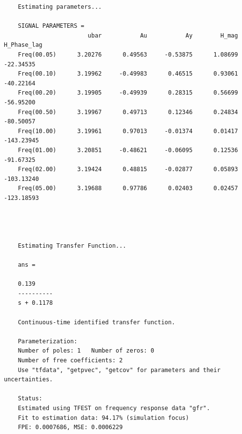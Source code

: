 \documentclass{article}
\begin{document}
\begin{verbatim}
	Estimating parameters...
	
	SIGNAL PARAMETERS = 
	                    ubar           Au           Ay        H_mag  H_Phase_lag
	Freq(00.05)      3.20276      0.49563     -0.53875      1.08699    -22.34535
	Freq(00.10)      3.19962     -0.49983      0.46515      0.93061    -40.22164
	Freq(00.20)      3.19905     -0.49939      0.28315      0.56699    -56.95200
	Freq(00.50)      3.19967      0.49713      0.12346      0.24834    -80.50057
	Freq(10.00)      3.19961      0.97013     -0.01374      0.01417   -143.23945
	Freq(01.00)      3.20851     -0.48621     -0.06095      0.12536    -91.67325
	Freq(02.00)      3.19424      0.48815     -0.02877      0.05893   -103.13240
	Freq(05.00)      3.19688      0.97786      0.02403      0.02457   -123.18593
	
	
	
	
	Estimating Transfer Function...
	
	ans =
	
	0.139
	----------
	s + 0.1178
	
	Continuous-time identified transfer function.
	
	Parameterization:
	Number of poles: 1   Number of zeros: 0
	Number of free coefficients: 2
	Use "tfdata", "getpvec", "getcov" for parameters and their uncertainties.
	
	Status:                                                
	Estimated using TFEST on frequency response data "gfr".
	Fit to estimation data: 94.17% (simulation focus)      
	FPE: 0.0007686, MSE: 0.0006229 
\end{verbatim}
\begin{lstlisting}
	
\end{lstlisting}

\end{document}
